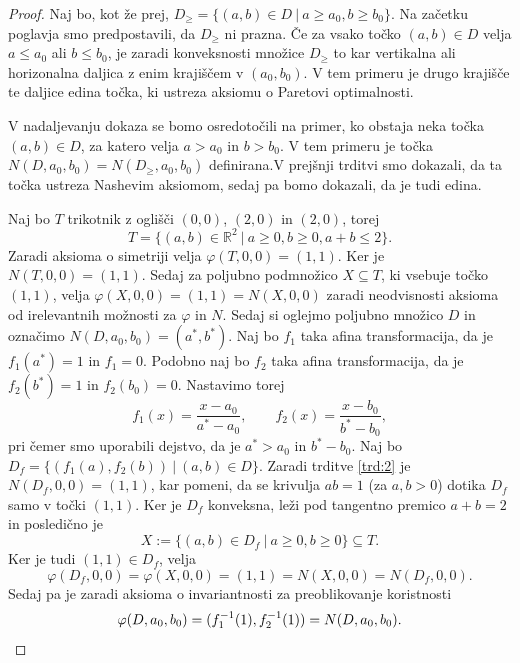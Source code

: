 \documentclass[10pt, a4paper]{article}
\newenvironment{noticeC}{%
  \tcolorbox[%
  notitle,
  empty,
  enhanced,  %
  breakable,
  coltext=black, 
  fontupper=\rmfamily,
  noparskip,
  sharp corners,
  boxrule=-1pt,  %
  frame hidden,
  left=7pt,  %
  right=7pt,
  top=5pt,
  bottom=5pt,
  before skip=2.5ex plus 2pt,
  after skip=2.5ex plus 2pt,
  overlay unbroken and last={%
  },
  ]}
{\endtcolorbox}
\newenvironment{dokaz}%
  {\begin{noticeC}\begin{proof}}%
  {\end{proof}\end{noticeC}}
\newcommand{\R}{\mathbb {R}}
\begin{document}
\begin{dokaz}
  Naj bo, kot že prej, $D_\geq = \{(a, b) \in D\ |\ a \geq a_0, b \geq b_0\}$.
  Na začetku poglavja smo predpostavili, da $D_\geq$ ni prazna.
  Če za vsako točko $(a, b) \in D$ velja $a \leq a_0$ ali $b \leq b_0$,
  je zaradi konveksnosti množice $D_\geq$ to kar vertikalna ali horizonalna daljica
  z enim krajiščem v $(a_0, b_0)$. V tem primeru je drugo krajišče te daljice edina 
  točka, ki ustreza aksiomu o Paretovi optimalnosti.
  
  V nadaljevanju dokaza se bomo osredotočili na primer,
  ko obstaja neka točka $(a, b) \in D$, za katero velja $a > a_0$
  in $b > b_0$. V tem primeru je točka $N(D, a_0, b_0) = N(D_\geq, a_0, b_0)$
  definirana.V prejšnji trditvi smo dokazali, da ta točka ustreza Nashevim aksiomom,
  sedaj pa bomo dokazali, da je tudi edina.

  Naj bo $T$ trikotnik z oglišči $(0, 0)$, $(2, 0)$ in $(2, 0)$, torej 
  $$T = \{(a, b) \in \R^2\ |\ a \geq 0, b\geq 0, a + b \leq 2\}.$$
  Zaradi aksioma o simetriji velja $\varphi(T, 0, 0) = (1, 1)$.
  Ker je $N(T, 0, 0) = (1, 1)$. Sedaj za poljubno podmnožico $X \subseteq T$,
  ki vsebuje točko $(1, 1)$, velja $\varphi(X, 0, 0) = (1, 1) = N(X, 0, 0)$
  zaradi neodvisnosti aksioma od irelevantnih možnosti za $\varphi$ in $N$.
  Sedaj si oglejmo poljubno množico $D$ in označimo $N(D, a_0, b_0) = (a^*, b^*)$.
  Naj bo $f_1$ taka afina transformacija, da je $f_1 (a^*) = 1$ in $f_1 = 0$.
  Podobno naj bo $f_2$ taka afina transformacija, da je $f_2 (b^*) = 1$ in $f_2(b_0) = 0.$
  Nastavimo torej 
  $$f_1 (x) = \frac{x - a_0}{a^* - a_0},\qquad f_2(x) = \frac{x - b_0}{b^* - b_0},$$
  pri čemer smo uporabili dejstvo, da je $a^* > a_0$ in $b^* - b_0$.
  Naj bo $D_f = \{(f_1(a), f_2(b))\ |\ (a, b) \in D\}$.
  Zaradi trditve \ref{trd:2} je $N(D_f, 0, 0) = (1, 1)$, kar pomeni,
  da se krivulja $ab = 1$ (za $a, b > 0$) dotika $D_f$
  samo v točki $(1, 1)$. Ker je $D_f$ konveksna, leži pod 
  tangentno premico $a + b = 2$ in posledično je 
  $$X := \{(a, b) \in D_f\ |\ a \geq 0, b\geq 0\} \subseteq T.$$
  Ker je tudi $(1, 1) \in D_f$, velja 
  $$\varphi(D_f, 0, 0) = \varphi(X, 0, 0) = (1, 1) = N(X, 0, 0) = N(D_f, 0, 0).$$
  Sedaj pa je zaradi aksioma o invariantnosti za preoblikovanje koristnosti
  \begin{equation*}
    \varphi(D, a_0, b_0) = (f_1^{-1} (1), f_2^{-1} (1)) = N(D, a_0, b_0). \qedhere
  \end{equation*}
\end{dokaz}
\end{document}
